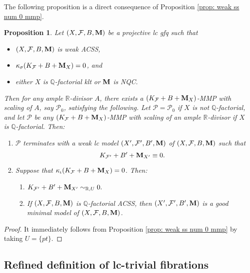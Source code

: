 \documentclass[11pt]{amsart}
\numberwithin{equation}{section}
\newcommand{\Mm}{{\bf{M}}}
\newcommand{\Qq}{\mathbb{Q}}
\newcommand{\Rr}{\mathbb{R}}
\newcommand{\Ff}{\mathcal{F}}
\newtheorem{prop}[thm]{Proposition}
\theoremstyle{definition}
\theoremstyle{definition}
\theoremstyle{definition}
\begin{document}
The following proposition is a direct consequence of Proposition \ref{prop: weak ss num 0 mmp}.

\begin{prop}\label{prop: projective num 0 mmp}
Let $(X,\Ff,B,\Mm)$ be a projective lc gfq such that%
\begin{itemize}
   \item $(X,\Ff,B,\Mm)$ is weak ACSS,
   \item $\kappa_{\sigma}(K_{\Ff}+B+\Mm_X)=0$, and
   \item either $X$ is $\Qq$-factorial klt or $\Mm$ is NQC.
\end{itemize} Then for any ample $\Rr$-divisor $A$, there exists a $(K_{\Ff}+B+\Mm_X)$-MMP with scaling of $A$, say $\mathcal{P}_0$, satisfying the following. Let $\mathcal{P}=\mathcal{P}_0$ if $X$ is not $\Qq$-factorial, and let $\mathcal{P}$ be any $(K_{\Ff}+B+\Mm_X)$-MMP with scaling of an ample $\Rr$-divisor if $X$ is $\Qq$-factorial. Then:
\begin{enumerate}
   \item $\mathcal{P}$ terminates with a weak lc model $(X',\Ff',B',\Mm)$ of $(X,\Ff,B,\Mm)$ such that
   $$K_{\Ff'}+B'+\Mm_{X'}\equiv 0.$$
   \item Suppose that $\kappa_{\iota}(K_{\Ff}+B+\Mm_X)=0$. Then:
   \begin{enumerate}
       \item  $K_{\Ff'}+B'+\Mm_{X'}\sim_{\mathbb R,U}0.$
       \item  If $(X,\Ff,B,\Mm)$ is $\Qq$-factorial ACSS, then $(X',\Ff',B',\Mm)$ is a good minimal model of $(X,\Ff,B,\Mm)$.
   \end{enumerate}
\end{enumerate}
\end{prop}
\begin{proof}
It immediately follows from  Proposition \ref{prop: weak ss num 0 mmp} by taking $U=\{pt\}$.
\end{proof}

\subsection{Refined definition of lc-trivial fibrations}
\end{document}

